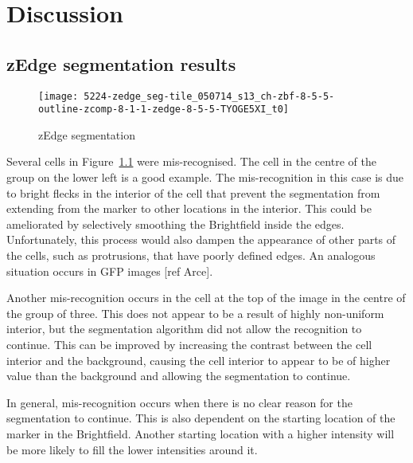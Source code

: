 
\chapter{Discussion}

\ifpdf
    \graphicspath{{Chapter7/Figs/Raster/}{Chapter7/Figs/PDF/}{Chapter7/Figs/}}
\else
    \graphicspath{{Chapter7/Figs/Vector/}{Chapter7/Figs/}}
\fi

\section{zEdge segmentation results}

\begin{figure}[htbp!]
\centering
\texttt{[image: 5224-zedge\_seg-tile\_050714\_s13\_ch-zbf-8-5-5-outline-zcomp-8-1-1-zedge-8-5-5-TYOGE5XI\_t0]}
\caption{zEdge segmentation}
\label{fig:zedge_segmentation}
\end{figure}

Several cells in Figure~\ref{fig:zedge_segmentation} were mis-recognised. The cell in the centre of the group on the lower left is a good example. The mis-recognition in this case is due to bright flecks in the interior of the cell that prevent the segmentation from extending from the marker to other locations in the interior. This could be ameliorated by selectively smoothing the Brightfield inside the edges. Unfortunately, this process would also dampen the appearance of other parts of the cells, such as protrusions, that have poorly defined edges. An analogous situation occurs in GFP images [ref Arce].

Another mis-recognition occurs in the cell at the top of the image in the centre of the group of three. This does not appear to be a result of highly non-uniform interior, but the segmentation algorithm did not allow the recognition to continue. This can be improved by increasing the contrast between the cell interior and the background, causing the cell interior to appear to be of higher value than the background and allowing the segmentation to continue.

In general, mis-recognition occurs when there is no clear reason for the segmentation to continue. This is also dependent on the starting location of the marker in the Brightfield. Another starting location with a higher intensity will be more likely to fill the lower intensities around it.

